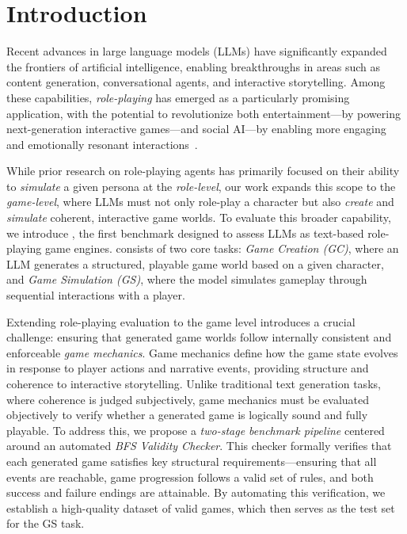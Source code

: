 \section{Introduction}

Recent advances in large language models (LLMs) have significantly expanded the frontiers of artificial intelligence, enabling breakthroughs in areas such as content generation, conversational agents, and interactive storytelling. Among these capabilities, \emph{role-playing} has emerged as a particularly promising application, with the potential to revolutionize both entertainment—by powering next-generation interactive games—and social AI—by enabling more engaging and emotionally resonant interactions~\cite{chen2024from}.

While prior research on role-playing agents has primarily focused on their ability to \emph{simulate} a given persona at the \emph{role-level}, our work expands this scope to the \emph{game-level}, where LLMs must not only role-play a character but also \emph{create} and \emph{simulate} coherent, interactive game worlds. To evaluate this broader capability, we introduce \benchmark{}, the first benchmark designed to assess LLMs as text-based role-playing game engines. \benchmark{} consists of two core tasks: \emph{Game Creation (GC)}, where an LLM generates a structured, playable game world based on a given character, and \emph{Game Simulation (GS)}, where the model simulates gameplay through sequential interactions with a player.

Extending role-playing evaluation to the game level introduces a crucial challenge: ensuring that generated game worlds follow internally consistent and enforceable \emph{game mechanics}. Game mechanics define how the game state evolves in response to player actions and narrative events, providing structure and coherence to interactive storytelling. Unlike traditional text generation tasks, where coherence is judged subjectively, game mechanics must be evaluated objectively to verify whether a generated game is logically sound and fully playable. To address this, we propose a \emph{two-stage benchmark pipeline} centered around an automated \emph{BFS Validity Checker}. This checker formally verifies that each generated game satisfies key structural requirements—ensuring that all events are reachable, game progression follows a valid set of rules, and both success and failure endings are attainable. By automating this verification, we establish a high-quality dataset of valid games, which then serves as the test set for the GS task.


